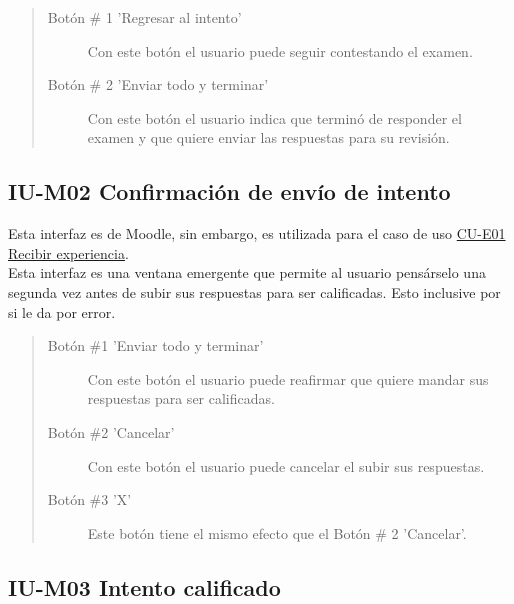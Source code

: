     \begin{quote}
    \begin{description}
    	\item[Botón \# 1 'Regresar al intento'] Con este botón el usuario puede seguir contestando el examen.
    	\item[Botón \# 2 'Enviar todo y terminar'] Con este botón el usuario indica que terminó de responder el examen y que quiere enviar las respuestas para su revisión.
    \end{description}
    \end{quote}
	\clearpage

\subsection*{IU-M02 Confirmación de envío de intento}
\label{IUM02}

    Esta interfaz es de Moodle, sin embargo, es utilizada para el caso de uso  \hyperref[CU-E01]{CU-E01 Recibir experiencia}.\\
    
    \noindent Esta interfaz es una ventana emergente que permite al usuario pensárselo una segunda vez antes de subir sus respuestas para ser calificadas. Esto inclusive por si le da por error.\\   

    
    \begin{quote}
    \begin{description}
    	\item[Botón \#1 'Enviar todo y terminar'] Con este botón el usuario puede reafirmar que quiere mandar sus respuestas para ser calificadas.
    	\item[Botón \#2 'Cancelar'] Con este botón el usuario puede cancelar el subir sus respuestas.
    	\item[Botón \#3 'X'] Este botón tiene el mismo efecto que el Botón \# 2 'Cancelar'.
    \end{description}
    \end{quote}
	\clearpage

\subsection*{IU-M03 Intento calificado}
\label{IUM03}

